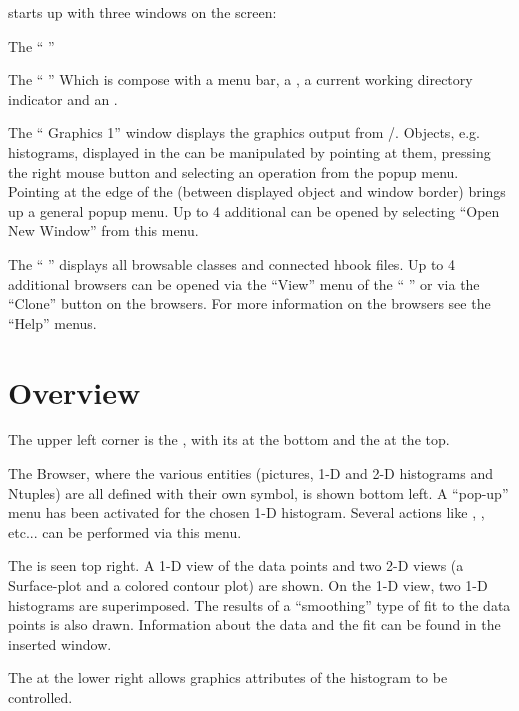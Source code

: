 \PAWPP{} starts up with three windows on the screen:

\begin{DL}{The ``\PAWPP{} \EW''}
\item[The ``\PAWPP{} \EW'']
   Which is compose with a menu bar, a \TP, a current working
   directory indicator and an \IP.

\item[The ``\PAWPP{} Graphics 1'']
   window displays the graphics output from \HIGZ/\Xxi.
   Objects, e.g. histograms, displayed in the \GW{} can be
   manipulated by pointing at them, pressing the right mouse button and
   selecting an operation from the popup menu. Pointing at the edge of the
   \GW{} (between displayed object and window border) brings up a
   general popup menu. Up to 4 additional \GW{} can be opened by
   selecting ``Open New Window'' from this menu.

\item[The ``\PAWPP{} \MB'']
   displays all browsable classes and connected
   hbook files. Up to 4 additional browsers can be opened via the ``View'' menu
   of the ``\PAWPP{} \EW'' or via the ``Clone'' button on the
   browsers. For more information on the browsers see the ``Help'' menus.
\end{DL}

\clearpage
\mbox{}
\clearpage

\section{Overview}


\begin{UL}
\item The upper left corner is the \PAWPP{} \EW, with its \IP{}
      at the bottom and the \TP{} at the top.
\item The \PAWPP{} Browser, where the various entities (pictures, 1-D and
      2-D histograms and Ntuples) are all defined with their own symbol,
      is shown bottom left.  A ``pop-up'' menu has been activated for the 
      chosen 1-D histogram. Several actions like , ,
       etc... can be performed via this menu.
\item The \GW{} is seen top right. 
      A 1-D view of the data points and two 2-D views (a Surface-plot and a 
      colored contour plot) are shown.
      On the 1-D view, two 1-D histograms are 
      superimposed. The results of a ``smoothing'' type of fit to the data 
      points is also drawn. Information about the data and the fit can be found
      in the inserted window.
\item The \HSP{} at the lower right allows graphics
      attributes of the histogram to be controlled.
\end{UL}

